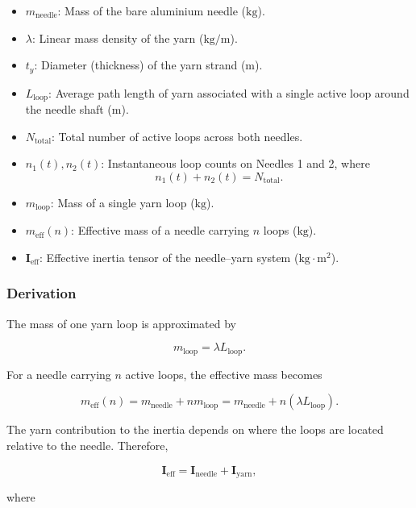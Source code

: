 \documentclass[12pt, a4paper]{article}
\begin{document}
\begin{itemize}
\item $m_{\text{needle}}$: Mass of the bare aluminium needle ($\mathrm{kg}$).
\item $\lambda$: Linear mass density of the yarn ($\mathrm{kg/m}$).
\item $t_y$: Diameter (thickness) of the yarn strand ($\mathrm{m}$).
\item $L_{\text{loop}}$: Average path length of yarn associated with a single active loop around the needle shaft ($\mathrm{m}$).
\item $N_{\text{total}}$: Total number of active loops across both needles.
\item $n_1(t), n_2(t)$: Instantaneous loop counts on Needles 1 and 2, where
\[
n_1(t)+n_2(t)=N_{\text{total}}.
\]
\item $m_{\text{loop}}$: Mass of a single yarn loop ($\mathrm{kg}$).
\item $m_{\text{eff}}(n)$: Effective mass of a needle carrying $n$ loops ($\mathrm{kg}$).
\item $\mathbf{I}_{\text{eff}}$: Effective inertia tensor of the needle--yarn system ($\mathrm{kg\cdot m^2}$).
\end{itemize}

\subsubsection*{Derivation}

The mass of one yarn loop is approximated by

\begin{equation}
m_{\text{loop}}
=
\lambda L_{\text{loop}}.
\end{equation}

For a needle carrying $n$ active loops, the effective mass becomes

\begin{equation}
m_{\text{eff}}(n)
=
m_{\text{needle}}
+
n m_{\text{loop}}
=
m_{\text{needle}}
+
n(\lambda L_{\text{loop}}).
\end{equation}

The yarn contribution to the inertia depends on where the loops are located relative to the needle. Therefore,

\begin{equation}
\mathbf{I}_{\text{eff}}
=
\mathbf{I}_{\text{needle}}
+
\mathbf{I}_{\text{yarn}},
\end{equation}

where
\end{document}
